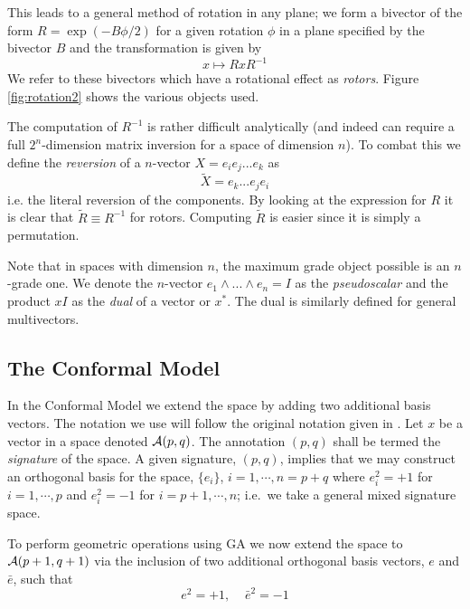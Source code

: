 This leads to a general method of rotation in any plane; we
form a bivector of the form $R = \exp({-B\phi/2})$ for a given rotation 
$\phi$ in a plane specified by the bivector $B$ and the transformation
is given by
\begin{displaymath}
x \mapsto RxR^{-1}
\end{displaymath}
We refer to these bivectors which have a rotational effect as \emph{rotors}.
Figure \ref{fig:rotation2} shows the various objects used.

The computation of $R^{-1}$ is rather difficult analytically (and indeed can
require a full $2^n$-dimension matrix inversion for a space of
dimension $n$). To combat this we define
the \emph{reversion} of a $n$-vector $X = e_ie_j...e_k$ as
\[
\tilde{X} = e_k...e_je_i
\]
i.e. the literal reversion of the components. By looking at the expression for
$R$ it is clear that $\tilde{R} \equiv R^{-1}$ for rotors. Computing $\tilde{R}$
is easier since it is simply a permutation.

Note that in spaces with dimension $n$, the maximum grade object 
possible is an $n$-grade
one. We denote the $n$-vector $e_1 \wedge ... \wedge e_n = I$ as the \emph{pseudoscalar}
and the product $xI$ as the \emph{dual} of a vector or $x^*$. The dual is similarly defined
for general multivectors.

\subsection{The Conformal Model}

In the Conformal Model \cite{GA:NFCM} we extend the space by adding two 
additional basis
vectors. 
The notation we use will follow the original notation given in
\cite{HS84}. Let $x$ be a vector in a space denoted ${\cala}(p,q)$.
The annotation $(p,q)$ shall be termed the \emph{signature} of the space. 
A given signature, $(p,q)$, implies that we may construct an 
orthogonal basis for the space,
$\{e_i\}$, $i=1,\cdots,n=p+q$ where $e_i^2=+1$ for $i=1,\cdots,p$
and $e_i^2=-1$ for $i=p+1,\cdots,n$; i.e.\ we take a general mixed
signature space.  

To perform geometric operations using GA we now extend the space 
to ${\cala}(p+1,q+1)$ via the inclusion of two additional orthogonal
basis  vectors, $e$ and
$\bar{e}$, such that
%
\[  e^2=+1,\;\;\;\; \bar{e}^2= -1
\]
%

